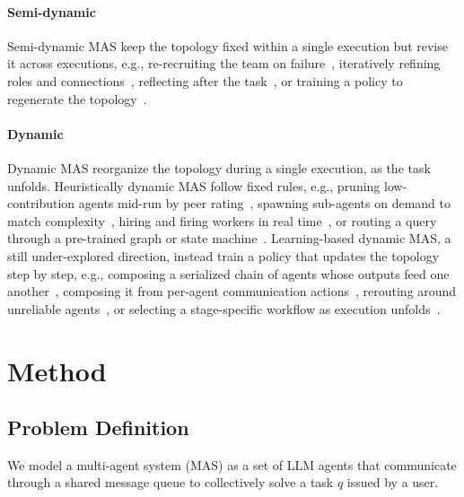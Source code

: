\documentclass{article} %
\begin{document}
\paragraph{Semi-dynamic}
Semi-dynamic MAS keep the topology fixed within a single execution but revise it across executions, e.g., re-recruiting the team on failure~\citep{chen2024agentverse}, iteratively refining roles and connections~\citep{hu2025evomac,wang2026metagen}, reflecting after the task~\citep{hao2026evolve}, or training a policy to regenerate the topology~\citep{wang2026agentconductor,wang2025mas2,gao2025flowreasoner}.

\paragraph{Dynamic}
Dynamic MAS reorganize the topology during a single execution, as the task unfolds.
Heuristically dynamic MAS follow fixed rules, e.g., pruning low-contribution agents mid-run by peer rating~\citep{liu2023dynamic}, spawning sub-agents on demand to match complexity~\citep{wang2025megaagent,ishibashi2024self}, hiring and firing workers in real time~\citep{lyu2026self}, or routing a query through a pre-trained graph or state machine~\citep{yang2025agentnet,zhang2025metaagent}.
Learning-based dynamic MAS, a still under-explored direction, instead train a policy that updates the topology step by step, e.g., composing a serialized chain of agents whose outputs feed one another~\citep{dang2026multi}, composing it from per-agent communication actions~\citep{jiang2026agentqmix}, rerouting around unreliable agents~\citep{fan2026todycomm}, or selecting a stage-specific workflow as execution unfolds~\citep{xu2026evomas,wang2026mango}.

\section{Method}

\subsection{Problem Definition}

We model a multi-agent system (MAS) as a set of LLM agents that communicate
through a shared message queue to collectively solve a task $q$ issued by a user.
\end{document}
